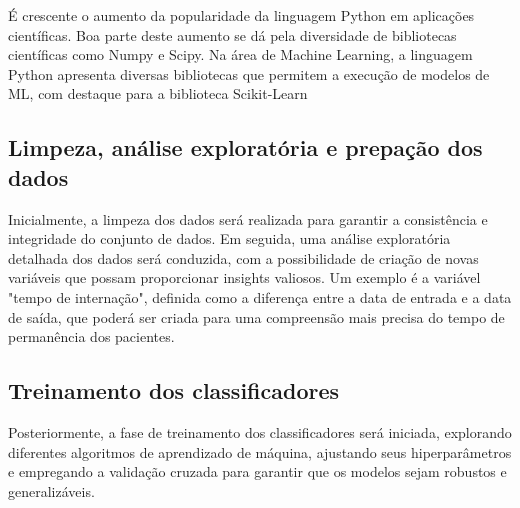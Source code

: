 É crescente o aumento da popularidade da linguagem Python em aplicações científicas.
Boa parte deste aumento se dá pela diversidade de bibliotecas científicas como Numpy e Scipy. Na área de Machine Learning, a linguagem Python apresenta diversas bibliotecas que permitem a execução de modelos de ML, com destaque para a biblioteca Scikit-Learn \cite{Buitinck}
%

\subsection{Limpeza, análise exploratória e prepação dos dados}\label{sec:limpeza}

Inicialmente, a limpeza dos dados será realizada para garantir a consistência e integridade do conjunto de dados. Em seguida, uma análise exploratória detalhada dos dados será conduzida, com a possibilidade de criação de novas variáveis que possam proporcionar insights valiosos. Um exemplo é a variável "tempo de internação", definida como a diferença entre a data de entrada e a data de saída, que poderá ser criada para uma compreensão mais precisa do tempo de permanência dos pacientes.

\subsection{Treinamento dos classificadores}

Posteriormente, a fase de treinamento dos classificadores será iniciada, explorando diferentes algoritmos de aprendizado de máquina, ajustando seus hiperparâmetros e empregando a validação cruzada para garantir que os modelos sejam robustos e generalizáveis.

